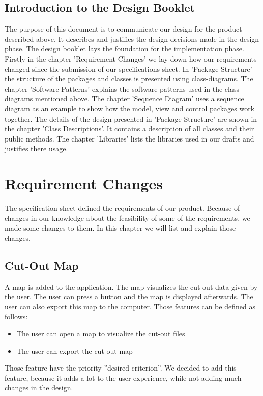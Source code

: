 \documentclass[letterpaper,10pt,english]{sphinxmanual}
\begin{document}
\section{Introduction to the Design Booklet}
\sphinxAtStartPar
The purpose of this document is to communicate our design for the product described above. It describes and justifies the design decisions made in the design phase. The design booklet lays the foundation for the implementation phase.\\
Firstly in the chapter 'Requirement Changes' we lay down how our requirements changed since the submission of our specifications sheet. In 'Package Structure' the structure of the packages and classes is presented using class-diagrams. The chapter 'Software Patterns' explains the software patterns used in the class diagrams mentioned above. The chapter 'Sequence Diagram' uses a sequence diagram as an example to show how the model, view and control packages work together. The details of the design presented in 'Package Structure' are shown in the chapter 'Class Descriptions'. It contains a description of all classes and their public methods. The chapter 'Libraries' lists the libraries used in our drafts and justifies there usage.




\chapter{Requirement Changes}
\label{\detokenize{index:requirement-changes}}
\sphinxstepscope
The specification sheet defined the requirements of our product. Because of changes in our knowledge about the feasibility of some of the requirements, we made some changes to them. In this chapter we will list and explain those changes.

\section*{Cut-Out Map}
A map is added to the application. The map visualizes the cut-out data given by the user. The user can press a button and the map is displayed afterwards. The user can also export this map to the computer. Those features can be defined as follows:
\begin{itemize}
    \item <WK9> The user can open a map to visualize the cut-out files
    \item <WK10> The user can export the cut-out map
\end{itemize}
Those feature have the priority ''desired criterion''. We decided to add this feature, because it adds a lot to the user experience, while not adding much changes in the design.
\end{document}
